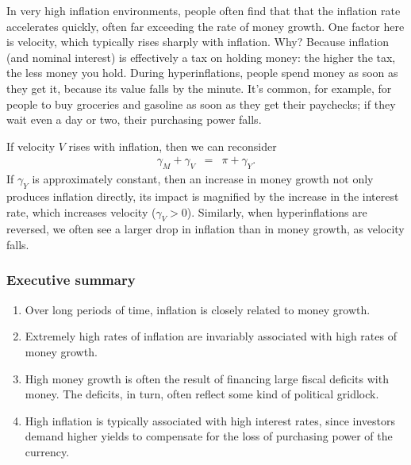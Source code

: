 \documentclass[letterpaper,12pt]{article}
\begin{document}
In very high inflation environments,
people often find that that the inflation rate accelerates
quickly, often far exceeding the rate of money growth.
One factor here is velocity, which typically
rises sharply with inflation.
Why?
Because inflation (and nominal interest) is effectively a tax on holding money:
the higher the tax, the less money you hold.
During hyperinflations,
people spend money as soon as they get it, because its
value falls by the minute.
It's common, for example, for people to buy groceries
and gasoline as soon as they get their paychecks;
if they wait even a day or two, their purchasing power falls.

If velocity $V$ rises with inflation, then we can reconsider
\begin{eqnarray}
    \gamma_M + \gamma_V  &=&  \pi + \gamma_Y .
\end{eqnarray}
If $\gamma_Y$ is approximately constant,
then an increase in money growth not only
produces inflation directly,
its impact is magnified by the increase in the
interest rate, which increases velocity ($\gamma_V > 0$).
Similarly, when hyperinflations are reversed,
we often see a larger drop in inflation
than in money growth, as velocity falls.


\subsubsection*{Executive summary}

\begin{enumerate}

\item Over long periods of time, inflation is closely related to money growth.


\item Extremely high rates of inflation are invariably associated with high rates of money growth.

\item High money growth is often the result of financing large fiscal deficits with money.
    The deficits, in turn, often reflect some kind of political gridlock.

\item High inflation is typically associated with high interest rates,
since investors demand higher yields to compensate for the loss of purchasing
power of the currency.

\end{enumerate}
\end{document}

